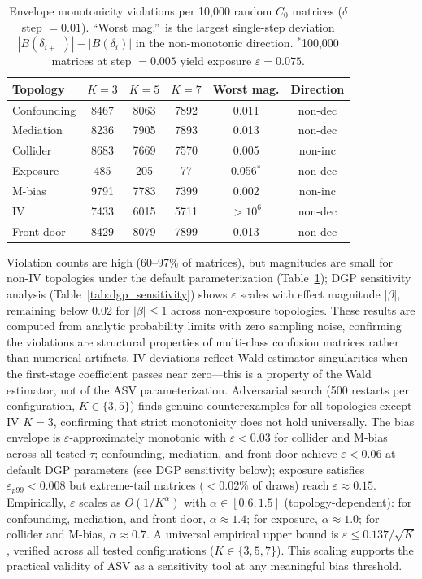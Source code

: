 \begin{table}[h]
\centering
\small
\caption{Envelope monotonicity violations per 10{,}000 random $C_0$ matrices ($\delta$ step $= 0.01$). ``Worst mag.''\ is the largest single-step deviation $|B(\delta_{i+1})|-|B(\delta_i)|$ in the non-monotonic direction. $^*$100{,}000 matrices at step $= 0.005$ yield exposure $\varepsilon = 0.075$.}
\label{tab:conjecture_verify}
\begin{tabular}{lccccc}
\toprule
\textbf{Topology} & $K{=}3$ & $K{=}5$ & $K{=}7$ & \textbf{Worst mag.} & \textbf{Direction} \\
\midrule
Confounding & 8467 & 8063 & 7892 & 0.011 & non-dec \\
Mediation   & 8236 & 7905 & 7893 & 0.013 & non-dec \\
Collider    & 8683 & 7669 & 7570 & 0.005 & non-inc \\
Exposure    & 485  & 205  & 77   & 0.056$^*$ & non-dec \\
M-bias      & 9791 & 7783 & 7399 & 0.002 & non-inc \\
IV          & 7433 & 6015 & 5711 & $>10^6$ & non-dec \\
Front-door  & 8429 & 8079 & 7899 & 0.013 & non-dec \\
\bottomrule
\end{tabular}
\end{table}

Violation counts are high (60--97\% of matrices), but magnitudes are small for non-IV topologies under the default parameterization (Table~\ref{tab:conjecture_verify}); DGP sensitivity analysis (Table~\ref{tab:dgp_sensitivity}) shows $\varepsilon$ scales with effect magnitude $|\beta|$, remaining below 0.02 for $|\beta| \leq 1$ across non-exposure topologies. These results are computed from analytic probability limits with zero sampling noise, confirming the violations are structural properties of multi-class confusion matrices rather than numerical artifacts. IV deviations reflect Wald estimator singularities when the first-stage coefficient passes near zero---this is a property of the Wald estimator, not of the ASV parameterization. Adversarial search (500 restarts per configuration, $K \in \{3,5\}$) finds genuine counterexamples for all topologies except IV $K{=}3$, confirming that strict monotonicity does not hold universally. The bias envelope is $\varepsilon$-approximately monotonic with $\varepsilon < 0.03$ for collider and M-bias across all tested $\tau$; confounding, mediation, and front-door achieve $\varepsilon < 0.06$ at default DGP parameters (see DGP sensitivity below); exposure satisfies $\varepsilon_{p99} < 0.008$ but extreme-tail matrices ($<$0.02\% of draws) reach $\varepsilon \approx 0.15$. Empirically, $\varepsilon$ scales as $O(1/K^\alpha)$ with $\alpha \in [0.6, 1.5]$ (topology-dependent): for confounding, mediation, and front-door, $\alpha \approx 1.4$; for exposure, $\alpha \approx 1.0$; for collider and M-bias, $\alpha \approx 0.7$. A universal empirical upper bound is $\varepsilon \leq 0.137/\sqrt{K}$, verified across all tested configurations ($K \in \{3,5,7\}$). This scaling supports the practical validity of ASV as a sensitivity tool at any meaningful bias threshold.

